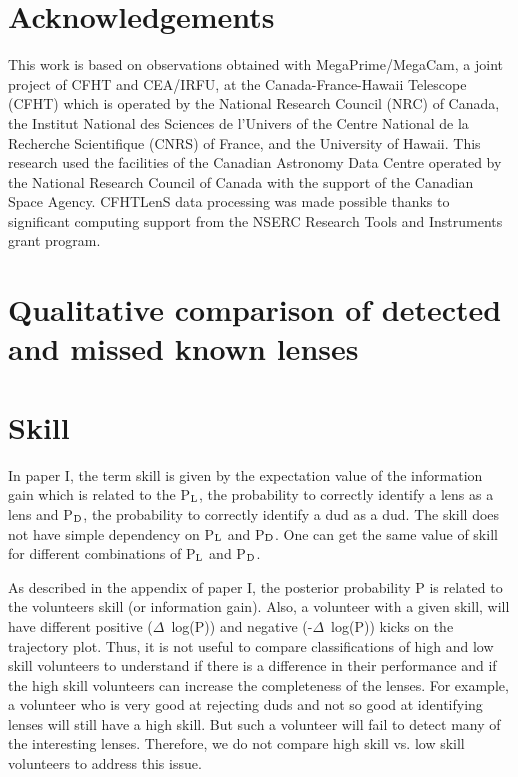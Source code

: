 \documentclass[useAMS,usenatbib,a4paper]{mn2e}
\begin{document}
\twocolumn


\section*{Acknowledgements}
 

This work is based on observations obtained with MegaPrime/MegaCam, a joint
project of CFHT and CEA/IRFU, at the Canada-France-Hawaii Telescope (CFHT) which
is operated by the National Research Council (NRC) of Canada, the Institut
National des Sciences de l'Univers of the Centre National de la Recherche
Scientifique (CNRS) of France, and the University of Hawaii. This research used
the facilities of the Canadian Astronomy Data Centre operated by the National
Research Council of Canada with the support of the Canadian Space Agency.
CFHTLenS data processing was made possible thanks to significant computing
support from the NSERC Research Tools and Instruments grant program.


\appendix

\section{Qualitative comparison of detected and missed known lenses}
\label{appendix:traj}

\section{Skill}
\label{appendix:skill}
In paper I, the term skill is given by the expectation value of the
information gain which is related to the P$_{\rm L}$, the probability to
correctly identify a lens as a lens and P$_{\rm D}$, the probability to
correctly identify a dud as a dud. The skill does not have simple
dependency on P$_{\rm L}$ and P$_{\rm D}$. One can get the same value of
skill for different combinations of P$_{\rm L}$ and P$_{\rm D}$. 

As described in the appendix of paper I, the posterior probability P is
related to the volunteers skill (or information gain). Also, a volunteer
with a given skill, will have different positive ($\Delta$~log(P)) and
negative (-$\Delta$~log(P)) kicks on the trajectory plot. Thus, it is
not useful to compare classifications of high and low skill volunteers
to understand if there is a difference in their performance and if the
high skill volunteers can increase the completeness of the lenses. For
example, a volunteer who is very good at rejecting duds and not so good
at identifying lenses will still have a high skill. But such a
volunteer will fail to detect many of the interesting lenses. Therefore,
we do not compare high skill vs. low skill volunteers to address this
issue.
\end{document}
